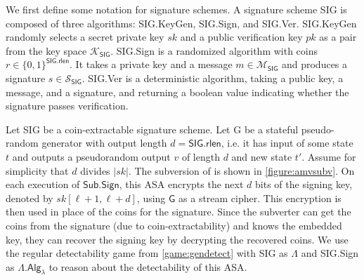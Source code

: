 We first define some notation for signature schemes. A signature scheme \textsf{SIG} is composed of three algorithms: \textsf{SIG.KeyGen}, \textsf{SIG.Sign}, and \textsf{SIG.Ver}. \textsf{SIG.KeyGen} randomly selects a secret private key $sk$ and a public verification key $pk$ as a pair from the key space $\mathcal{K}_\mathsf{SIG}$. \textsf{SIG.Sign} is a randomized algorithm with coins $r\in \{0,1\}^\mathsf{SIG.rlen}$. It takes a private key and a message $m\in \mathcal{M}_\mathsf{SIG}$ and produces a signature $s\in \mathcal{S}_\mathsf{SIG}$. \textsf{SIG.Ver} is a deterministic algorithm, taking a public key, a message, and a signature, and returning a boolean value indicating whether the signature passes verification.

Let \textsf{SIG} be a coin-extractable signature scheme. Let \textsf{G} be a stateful pseudo-random generator with output length $d=\textsf{SIG.rlen}$, i.e. it has input of some state $t$ and outputs a pseudorandom output $v$ of length $d$ and new state $t'$. Assume for simplicity that $d$ divides $|sk|$. The subversion of \cite{CCS:AteMagVen15} is shown in \autoref{figure:amvsubv}. On each execution of $\mathsf{Sub.Sign}$, this ASA encrypts the next $d$ bits of the signing key, denoted by $sk[\ell + 1, \ell + d]$, using $\mathsf{G}$ as a stream cipher. This encryption is then used in place of the coins for the signature. Since the subverter can get the coins from the signature (due to coin-extractability) and knows the embedded key, they can recover the signing key by decrypting the recovered coins. We use the regular detectability game from \autoref{game:gendetect} with \textsf{SIG} as $\mathsf{\Lambda}$ and \textsf{SIG.Sign} as $\mathsf{\Lambda.Alg}_\lambda$ to reason about the detectability of this ASA.

